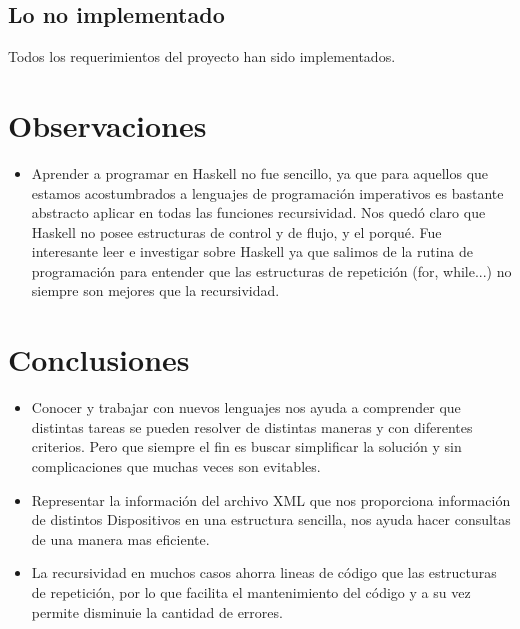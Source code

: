 \documentclass[11pt]{article} %
\begin{document}
\subsection{Lo no implementado} 
Todos los requerimientos del proyecto han sido implementados.

\section{Observaciones}
\begin{itemize}
\item Aprender a programar en Haskell no fue sencillo, ya que para aquellos que estamos acostumbrados a lenguajes de programación imperativos es bastante abstracto aplicar en todas las funciones recursividad. Nos quedó claro que Haskell no posee estructuras de control y de flujo, y el porqué. Fue interesante leer e investigar sobre Haskell ya que salimos de la rutina de programación para entender que las estructuras de repetición (for, while...) no siempre son mejores que la recursividad.

\end{itemize}
\section{ Conclusiones}

\begin{itemize}
\item Conocer y trabajar con nuevos lenguajes nos ayuda a comprender que distintas tareas se pueden resolver de distintas maneras y con diferentes criterios. Pero que siempre el fin es buscar simplificar la solución y sin complicaciones que muchas veces son evitables.
\item Representar la información del archivo XML que nos proporciona información de distintos Dispositivos en una estructura sencilla, nos ayuda hacer consultas de una manera mas eficiente. 
\item La recursividad en muchos casos ahorra lineas de código que las estructuras de repetición, por lo que facilita el mantenimiento del código y a su vez permite disminuie la cantidad de errores. 
\end {itemize}
\end{document}
